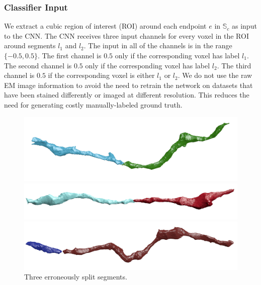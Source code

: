 \subsubsection{Classifier Input}

We extract a cubic region of interest (ROI) around each endpoint $e$ in $\mathbb{S}_c$ as input to the CNN. 
The CNN receives three input channels for every voxel in the ROI around segments $l_1$ and $l_2$. 
The input in all of the channels is in the range $\{-0.5, 0.5\}$. 
The first channel is $0.5$ only if the corresponding voxel has label $l_1$. 
The second channel is $0.5$ only if the corresponding voxel has label $l_2$. 
The third channel is $0.5$ if the corresponding voxel is either $l_1$ or $l_2$.
We do not use the raw EM image information to avoid the need to retrain the network on datasets that have been stained differently or imaged at different resolution. 
This reduces the need for generating costly manually-labeled ground truth. 

\begin{figure}[t]
	\centering
	\begin{minipage}{0.32\linewidth}
		\includegraphics[width=\linewidth]{./figures/split_error1.png}		
	\end{minipage}
	\hfill
	\begin{minipage}{0.32\linewidth}
		\includegraphics[width=\linewidth]{./figures/split_error2.png}				
	\end{minipage}
	\hfill
	\begin{minipage}{0.32\linewidth}
		\includegraphics[width=\linewidth]{./figures/split_error3.png}
	\end{minipage}
	\caption{Three erroneously split segments.}
	\label{fig:merge_candidates}
\end{figure}

